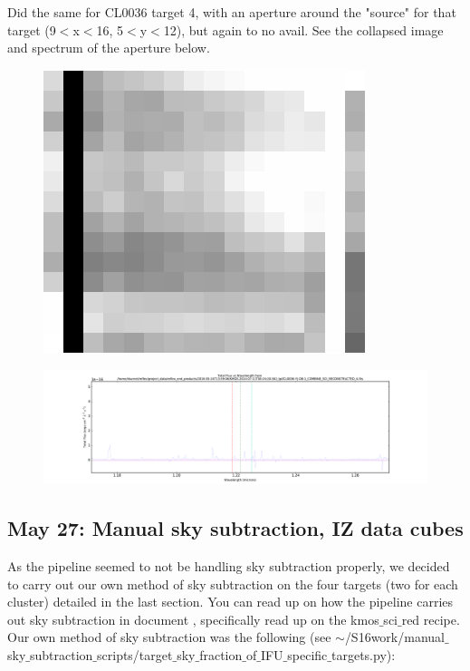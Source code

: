\documentclass[10pt,letterpaper]{article}
\begin{document}
Did the same for CL0036 target 4, with an aperture around the "source" for that target (9$<$x$<$16, 5$<$y$<$12), but again to no avail. See the collapsed image and spectrum of the aperture below.\\

\begin{figure}[h!]
\includegraphics[scale=0.4]{figures/CL0036_target_4_OB1_collapsed.png}
\end{figure}

\begin{figure}[h!]
\includegraphics[scale=0.4]{figures/CL0036-YJ-OB-1_COMBINE_SCI_RECONSTRUCTED_4_specific_spaxels.pdf}
\end{figure}

\subsection{May 27: Manual sky subtraction, IZ data cubes}
As the pipeline seemed to not be handling sky subtraction properly, we decided to carry out our own method of sky subtraction on the four targets (two for each cluster) detailed in the last section. You can read up on how the pipeline carries out sky subtraction in document \cite{KMOS pipeline manual}, specifically read up on the kmos$\_$sci$\_$red recipe. Our own method of sky subtraction was the following (see $\sim$/S16work/manual$\_$sky$\_$subtraction$\_$scripts/target$\_$sky$\_$fraction$\_$of$\_$IFU$\_$specific$\_$targets.py):\\
\end{document}
